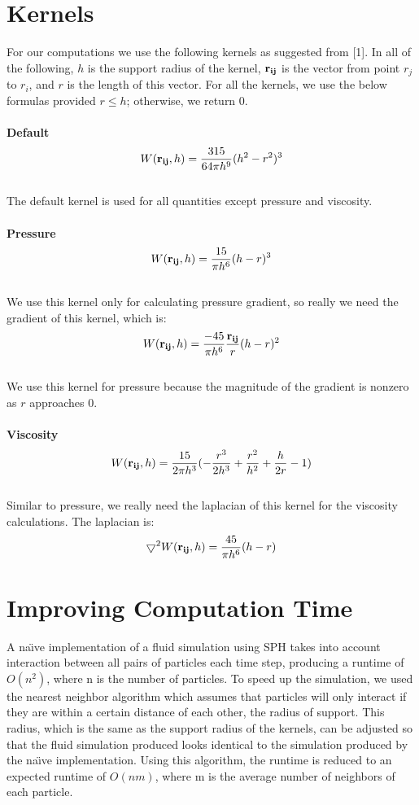 \documentclass[11pt]{article}
\begin{document}
\section*{Kernels}
For our computations we use the following kernels as suggested from [1]. In all of the following, $h$ is the support radius of the kernel, ${\bf r_{ij}}$ is the vector from point $r_j$ to $r_i$, and $r$ is the length of this vector. For all the kernels, we use the below formulas provided $r\leq h$; otherwise, we return $0$.\\ \\
{\bf Default}
$$W({\bf r_{ij}},h) = \frac{315}{64\pi h^9}(h^2 - r^2)^3 $$ \\
The default kernel is used for all quantities except pressure and viscosity.
\\
\\
{\bf Pressure}
$$ W({\bf r_{ij}},h) = \frac{15}{\pi h^6}(h-r)^3$$
\\
We use this kernel only for calculating pressure gradient, so really we need the gradient of this kernel, which is:
\\
$$ W({\bf r_{ij}},h) = \frac{-45}{\pi h^6}\frac{{\bf r_{ij}}}{r}(h-r)^2$$
\\
We use this kernel for pressure because the magnitude of the gradient is nonzero as $r$ approaches $0$.
\\
\\
{\bf Viscosity}
$$W({\bf r_{ij}},h) = \frac{15}{2\pi h^3}(-\frac{r^3}{2h^3} + \frac{r^2}{h^2} + \frac{h}{2r} - 1) $$
\\
Similar to pressure, we really need the laplacian of this kernel for the viscosity calculations. The laplacian is:
\\
$$\bigtriangledown^2 W({\bf r_{ij}},h) = \frac{45}{\pi h^6}(h-r) $$


\section*{Improving Computation Time}
A  na\"{\i}ve implementation of a fluid simulation using SPH takes into account interaction between all pairs of particles each time step, producing a runtime of $O(n^2)$, where n is the number of particles. To speed up the simulation, we used the nearest neighbor algorithm which assumes that particles will only interact if they are within a certain distance of each other, the radius of support. This radius, which is the same as the support radius of the kernels, can be adjusted so that the fluid simulation produced looks identical to the simulation produced by the  na\"{\i}ve implementation. Using this algorithm, the runtime is reduced to an expected runtime of $O(nm)$, where m is the average number of neighbors of each particle.
\end{document}
